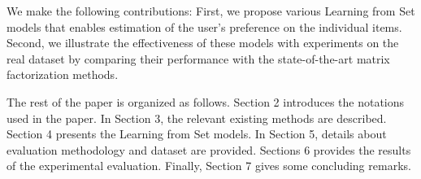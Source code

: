 
We make the following contributions: First, we propose various Learning from Set
models that enables estimation of the user's preference on the individual items.
Second, we illustrate the effectiveness of these models with experiments on the 
real dataset by comparing their performance with the state-of-the-art 
matrix factorization methods.


The rest of the paper is organized as follows. Section 2 introduces the
notations used in the paper. In Section 3, the relevant existing methods are
described. Section 4 presents the Learning from Set models. In Section 5,
details about evaluation methodology and dataset are provided. Sections 6
provides the results of the experimental evaluation. Finally, Section 7 gives
some concluding remarks.



